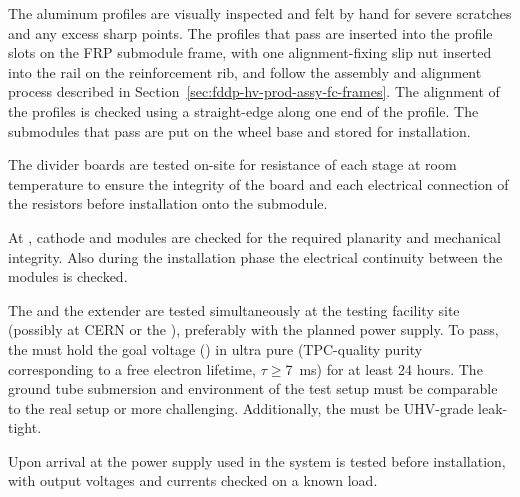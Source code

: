 
The aluminum profiles are visually inspected and felt by hand for severe scratches and any excess sharp points.  The profiles that pass are inserted into the profile slots on the FRP submodule frame, with one alignment-fixing slip nut inserted into the rail on the reinforcement rib, 
 and follow the assembly and alignment process described in Section~\ref{sec:fddp-hv-prod-assy-fc-frames}.  The alignment of the profiles is checked using a straight-edge along one end of the profile.  The submodules that pass are put on the wheel base and stored for installation.

The  divider boards are tested on-site for resistance of each stage at room temperature to ensure the integrity of the board and each electrical connection of the resistors before installation onto the submodule. 


At \surf, cathode and  modules are checked for the required planarity and mechanical integrity. Also during the installation phase  the electrical continuity between the modules is checked.

The \fdth and the  extender are tested simultaneously at the 
testing facility  site (possibly at CERN or the ), 
preferably with the planned %
power supply.  To pass, the \fdth must hold the goal voltage (\dptargetdriftvoltneg{}) in ultra pure \lar (TPC-quality purity corresponding to a free electron lifetime, $\tau\geq$\SI{7}{\ms}) for at least \num{24} hours. The ground tube submersion and \efield environment of the test setup must be comparable to the real  setup or more challenging.  Additionally, the \fdth must be UHV-grade leak-tight.

Upon arrival at \surf the power supply used in the   system is tested before installation, with  output voltages and currents checked on a known load. 

